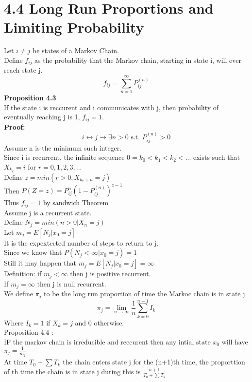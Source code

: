 \documentclass{article}
\begin{document}
\section*{4.4 Long Run Proportions and Limiting Probability}
Let $i \neq j$ be states of a Markov Chain.\\
Define $f_{ij}$ as the probability that the Markov chain, starting in state i, will ever reach state j.\\
$$f_{ij} = \sum_{n=1}^{\infty} P_{ij}^{(n)}$$
\textbf{Proposition 4.3}\\
If the state i is reccurent and i communicates with j, then probability of eventually reaching j is 1, $f_{ij} = 1$.\\
\textbf{Proof:}\\
$$i \leftrightarrow j \rightarrow \exists n > 0 \text{ s.t. } P_{ij}^{(n)} > 0$$ Assume n is the minimum such integer.\\
Since i is recurrent, the infinite sequence $0 = k_0 < k_1 < k_2 < ...$ exists such that $X_{k_r} = i$ for $r = 0,1,2,3,...$\\
Define $z = min( r> 0 , X_{k_r + n  } = j)$\\
Then $P(Z = z) =  P^n_{ij} (1 - P_{ij}^{(n)})^{z-1}$\\ 
Thus $f_{ij} = 1$ by sandwich Theorem\\
Assume j is a recurrent state.\\
Define $N_j = min(n > 0 | X_n = j)$\\
Let $m_j = E[N_j | x_0 = j]$\\
It is the expextected number of steps to return to j.\\
Since we know that $P(N_j < \infty| x_0 = j) = 1$\\
Still it may happen that $m_j = E[N_j | x_0 = j] = \infty$\\
Definition: if $m_j < \infty$ then j is positive recurrent.\\
If $m_j = \infty$ then j is null recurrent.\\
We define $\pi_j$ to be the long run proportion of time the Markoc chain is in state j.\\
$$\pi_j = \lim_{n \to \infty} \frac{1}{n} \sum_{k=0}^{n-1} I_k$$
Where $I_k = 1$ if $X_k = j$ and $0$ otherwise.\\
Proposition 4.4 :\\
IF the markov chain is irreducible and reccurent then any intial state $x_0$ will have $\pi_j = \frac{1}{m_j}$\\
At time $T_0 + \sum T_k$ the chain enters state j for the (n+1)th time, the proporttion of th time the chain is in state j during this is $\frac{n+1}{T_0 + \sum T_k}$\\
\end{document}
